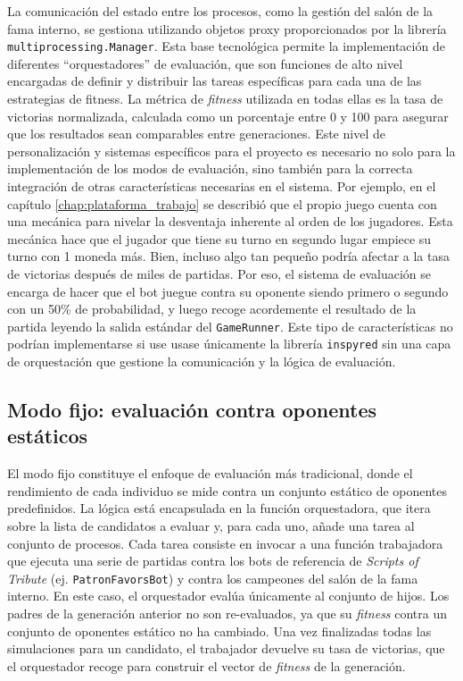 La comunicación del estado entre los procesos, como la gestión del salón de la fama interno, se gestiona utilizando objetos proxy proporcionados por la librería \texttt{multiprocessing.Manager}. Esta base tecnológica permite la implementación de diferentes ``orquestadores'' de evaluación, que son funciones de alto nivel encargadas de definir y distribuir las tareas específicas para cada una de las estrategias de fitness. La métrica de \textit{fitness} utilizada en todas ellas es la tasa de victorias normalizada, calculada como un porcentaje entre 0 y 100 para asegurar que los resultados sean comparables entre generaciones. Este nivel de personalización y sistemas específicos para el proyecto es necesario no solo para la implementación de los modos de evaluación, sino también para la correcta integración de otras características necesarias en el sistema. Por ejemplo, en el capítulo \ref{chap:plataforma_trabajo} se describió que el propio juego cuenta con una mecánica para nivelar la desventaja inherente al orden de los jugadores. Esta mecánica hace que el jugador que tiene su turno en segundo lugar empiece su turno con 1 moneda más. Bien, incluso algo tan pequeño podría afectar a la tasa de victorias después de miles de partidas. Por eso, el sistema de evaluación se encarga de hacer que el bot juegue contra su oponente siendo primero o segundo con un 50\% de probabilidad, y luego recoge acordemente el resultado de la partida leyendo la salida estándar del \texttt{GameRunner}. Este tipo de características no podrían implementarse si use usase únicamente la librería \texttt{inspyred} sin una capa de orquestación que gestione la comunicación y la lógica de evaluación.

\subsection{Modo fijo: evaluación contra oponentes estáticos} \label{sec:modo_fijo_evaluacion}

El modo fijo constituye el enfoque de evaluación más tradicional, donde el rendimiento de cada individuo se mide contra un conjunto estático de oponentes predefinidos. La lógica está encapsulada en la función orquestadora, que itera sobre la lista de candidatos a evaluar y, para cada uno, añade una tarea al conjunto de procesos. Cada tarea consiste en invocar a una función trabajadora que ejecuta una serie de partidas contra los bots de referencia de \textit{Scripts of Tribute} (ej. \texttt{PatronFavorsBot}) y contra los campeones del salón de la fama interno. En este caso, el orquestador evalúa únicamente al conjunto de hijos. Los padres de la generación anterior no son re-evaluados, ya que su \textit{fitness} contra un conjunto de oponentes estático no ha cambiado. Una vez finalizadas todas las simulaciones para un candidato, el trabajador devuelve su tasa de victorias, que el orquestador recoge para construir el vector de \textit{fitness} de la generación.

